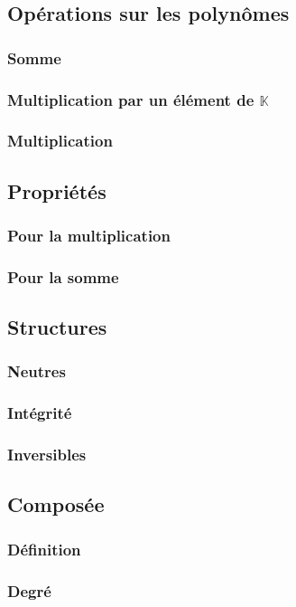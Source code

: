 \documentclass[12pt,a4paper,french]{book}
\begin{document}
		\subsection{Opérations sur les polynômes}
			\subsubsection{Somme}
			\subsubsection{Multiplication par un élément de $\mathbb{K}$}
			\subsubsection{Multiplication}
		\subsection{Propriétés}
			\subsubsection{Pour la multiplication}
			\subsubsection{Pour la somme}
		\subsection{Structures}
			\subsubsection{Neutres}
			\subsubsection{Intégrité}
			\subsubsection{Inversibles}
		\subsection{Composée}
			\subsubsection{Définition}
			\subsubsection{Degré}
\end{document}

